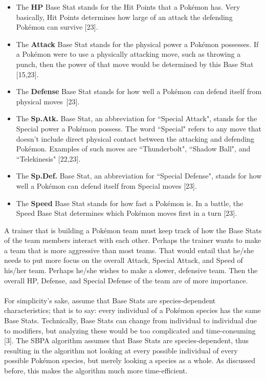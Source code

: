 \documentclass{article}
\begin{document}
\begin{itemize}
	\item The \textbf{HP} Base Stat stands for the Hit Points that a Pok\'emon has. Very basically, Hit Points determines how large of an attack the defending Pok\'emon can survive [23].
	\item The \textbf{Attack} Base Stat stands for the physical power a Pok\'emon possesses. If a Pok\'emon were to use a physically attacking move, such as throwing a punch, then the power of that move would be determined by this Base Stat [15,23]. 
	\item The \textbf{Defense} Base Stat stands for how well a Pok\'emon can defend itself from physical moves~[23]. 
	\item The \textbf{Sp.Atk.} Base Stat, an abbreviation for ``Special Attack", stands for the Special power a Pok\'emon possess. The word ``Special" refers to any move that doesn't include direct physical contact between the attacking and defending Pok\'emon. Examples of such moves are ``Thunderbolt", ``Shadow Ball", and ``Telekinesis" [22,23].
	\item The \textbf{Sp.Def.} Base Stat, an abbreviation for ``Special Defense", stands for how well a Pok\'emon can defend itself from Special moves [23].
	\item The \textbf{Speed} Base Stat stands for how fast a Pok\'emon is. In a battle, the Speed Base Stat determines which Pok\'emon moves first in a turn [23].
\end{itemize}
A trainer that is building a Pok\'emon team must keep track of how the Base Stats of the team members interact with each other. Perhaps the trainer wants to make a team that is more aggressive than most teams. That would entail that he/she needs to put more focus on the overall Attack, Special Attack, and Speed of his/her team. Perhaps he/she wishes to make a slower, defensive team. Then the overall HP, Defense, and Special Defense of the team are of more importance.\\\\
For simplicity's sake, assume that Base Stats are species-dependent characteristics; that is to say: every individual of a Pok\'emon species has the same Base Stats. Technically, Base Stats can change from individual to individual due to modifiers, but analyzing these would be too complicated and time-consuming [3]. The SBPA algorithm assumes that Base Stats are species-dependent, thus resulting in the algorithm not looking at every possible individual of every possible Pok\'emon species, but merely looking a species as a whole. As discussed before, this makes the algorithm much more time-efficient.
\end{document}
